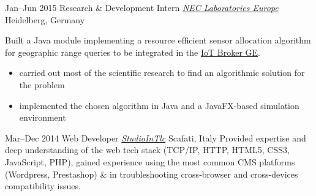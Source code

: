 \begin{entrylist}
\entry
{Jan--Jun 2015}
{Research \& Development Intern {\normalfont \emph{\href{https://uk.nec.com/}{NEC Laboratories Europe}}}}
{Heidelberg, Germany}
{Built a Java module implementing a resource efficient sensor allocation algorithm for geographic range queries to be integrated in the \href{https://github.com/Aeronbroker/Aeron}{IoT Broker GE}.
\vspace{-.2cm}
\begin{itemize}[leftmargin=.6cm]
	\item carried out most of the scientific research to find an algorithmic solution for the problem
	\item implemented the chosen algorithm in Java and a JavaFX-based simulation environment
\end{itemize}
}

\entry
{Mar--Dec 2014}
{Web Developer {\normalfont \emph{\href{http://www.studiointlc.com/}{StudioInTlc}}}}
{Scafati, Italy}
{Provided expertise and deep understanding of the web tech stack (TCP/IP, HTTP, HTML5, CSS3, JavaScript, PHP), gained  experience using the most common CMS platforms (Wordpress, Prestashop) \& in troubleshooting cross-browser and cross-devices compatibility issues.}

\end{entrylist}

